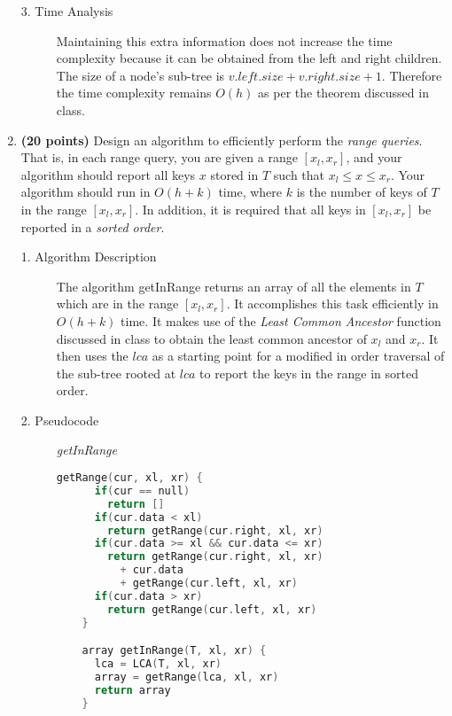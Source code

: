 \documentclass[11pt]{article}
\begin{document}
\begin{enumerate}
\begin{description}
  \item[3. Time Analysis]
    Maintaining this extra information does not increase the time complexity because it can be obtained from the left and right children. The size of a node's sub-tree is $v.left.size + v.right.size + 1$. Therefore the time complexity remains $O(h)$ as per the theorem discussed in class.

\end{description}

\item %
{\bf (20 points)}
Design an algorithm to efficiently perform the {\em range queries}. That is, in each range query, you are given a range $[x_l,x_r]$, and your algorithm should report all keys $x$ stored in $T$ such that $x_l\leq x\leq x_r$. Your algorithm should run in $O(h+k)$ time, where $k$ is the number of keys of $T$ in the range $[x_l,x_r]$. In addition, it is required that all keys in $[x_l,x_r]$ be reported in a {\em sorted order}.

\begin{description}
  \item[1. Algorithm Description]

    The algorithm getInRange returns an array of all the elements in $T$ which are in the range $[x_l, x_r]$. It accomplishes this task efficiently in $O(h+k)$ time. It makes use of the {\em Least Common Ancestor} function discussed in class to obtain the least common ancestor of $x_l$ and $x_r$. It then uses the $lca$ as a starting point for a modified in order traversal of the sub-tree rooted at $lca$ to report the keys in the range in sorted order.

  \item[2. Pseudocode]
    \textit{getInRange}
    \begin{lstlisting}[language=C++]
    getRange(cur, xl, xr) {
      if(cur == null)
        return []
      if(cur.data < xl)
        return getRange(cur.right, xl, xr)
      if(cur.data >= xl && cur.data <= xr)
        return getRange(cur.right, xl, xr)
          + cur.data
          + getRange(cur.left, xl, xr)
      if(cur.data > xr)
        return getRange(cur.left, xl, xr)
    }

    array getInRange(T, xl, xr) {
      lca = LCA(T, xl, xr)
      array = getRange(lca, xl, xr)
      return array
    }
    \end{lstlisting}


\end{description}
\end{enumerate}
\end{document}
